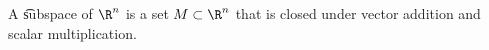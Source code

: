 
A \t{subspace} of $\R ^n$ is a set $M \subset \R ^n$ that is closed under vector addition and scalar multiplication.

\blankpage
